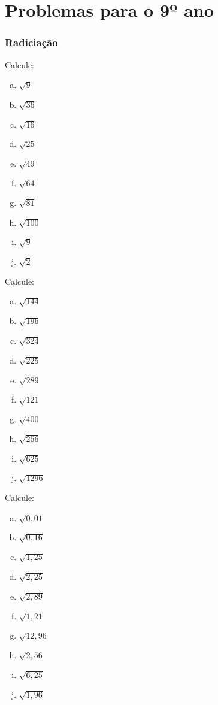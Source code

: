 \chapter{Problemas para o 9º ano}
\subsection{Radiciação}

\item Calcule:
\begin{multicols}{5}
\begin{enumerate}[a)]
	\item $\sqrt{9}$
	\item $\sqrt{36}$
	\item $\sqrt{16}$
	\item $\sqrt{25}$
	\item $\sqrt{49}$

	\item $\sqrt{64}$
	\item $\sqrt{81}$
	\item $\sqrt{100}$
	\item $\sqrt{9}$
	\item $\sqrt{2}$
\end{enumerate}
\end{multicols}

\item Calcule:
\begin{multicols}{5}
\begin{enumerate}[a)]
	\item $\sqrt{144}$
	\item $\sqrt{196}$
	\item $\sqrt{324}$
	\item $\sqrt{225}$
	\item $\sqrt{289}$

	\item $\sqrt{121}$
	\item $\sqrt{400}$
	\item $\sqrt{256}$
	\item $\sqrt{625}$
	\item $\sqrt{1296}$
\end{enumerate}
\end{multicols}

\item Calcule:
\begin{multicols}{5}
\begin{enumerate}[a)]
	\item $\sqrt{0,01}$
	\item $\sqrt{0,16}$
	\item $\sqrt{1,25}$
	\item $\sqrt{2,25}$
	\item $\sqrt{2,89}$

	\item $\sqrt{1,21}$
	\item $\sqrt{12,96}$
	\item $\sqrt{2,56}$
	\item $\sqrt{6,25}$
	\item $\sqrt{1,96}$
\end{enumerate}
\end{multicols}
